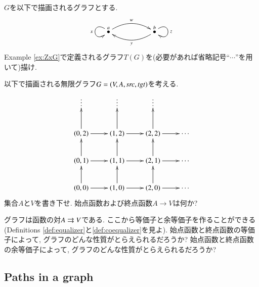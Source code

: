 \begin{exercise}\label{exc:secret turing}
$G$を以下で描画されるグラフとする.
$$
\xymatrix{\LMO{a}\ar@/^1pc/[rr]^w\ar@(lu,ld)[]_x&&\LMO{b}\ar@/^1pc/[ll]^y\ar@(ur,dr)[]^z}
$$
Example \ref{ex:ZxG}で定義されるグラフ$T(G)$を(必要があれば省略記号``$\cdots$''を用いて)描け.
\end{exercise}

\begin{exercise}\label{exc:lattice}
以下で描画される無限グラフ$G=(V,A,\operatorname{\mathit{src}},\operatorname{\mathit{tgt}})$を考える.
$$
\xymatrix{
\vdots&\vdots&\vdots\\
(0,2)\ar[r]\ar[u]&(1,2)\ar[r]\ar[u]&(2,2)\ar[r]\ar[u]&\cdots\\
(0,1)\ar[r]\ar[u]&(1,1)\ar[r]\ar[u]&(2,1)\ar[r]\ar[u]&\cdots\\
(0,0)\ar[r]\ar[u]&(1,0)\ar[r]\ar[u]&(2,0)\ar[r]\ar[u]&\cdots}
$$
\sexc 集合$A$と$V$を書き下せ.
\next 始点函数および終点函数$A\to V$は何か?
\endsexc
\end{exercise}

\begin{exercise}\label{exc:(co)equalizer of graph}
グラフは函数の対$A\rightrightarrows V$である. ここから等価子と余等価子を作ることができる(Definitions \ref{def:equalizer}と\ref{def:coequalizer}を見よ).
\sexc 始点函数と終点函数の等価子によって, グラフのどんな性質がとらえられるだろうか?
\next 始点函数と終点函数の余等価子によって, グラフのどんな性質がとらえられるだろうか?
\endsexc
\end{exercise}


\subsection{Paths in a graph}\label{sec:paths in graph}

